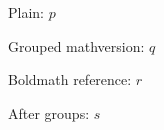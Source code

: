 \documentclass{article}
\begin{document}
Plain: $p$

Grouped mathversion: {$q$}

Boldmath reference: {\boldmath$r$}

After groups: $s$
\end{document}
